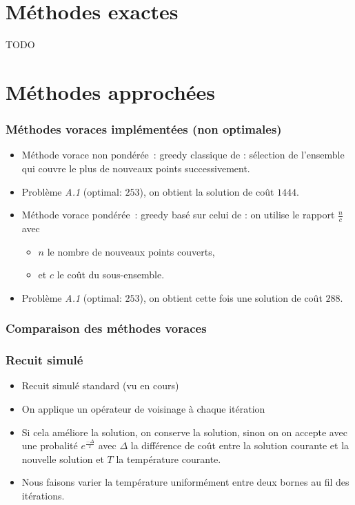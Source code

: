\documentclass[aspectratio=169,11pt]{beamer}
\begin{document}
	\section{Méthodes exactes}

	\begin{frame}
		\centering TODO
	\end{frame}

	\section{Méthodes approchées}

	\begin{frame}
		\frametitle{Méthodes voraces implémentées (non optimales)}
		\begin{itemize}
			\item<1-> Méthode vorace non pondérée~: greedy classique de \citeauthor{Johnson:1973:AAC:800125.804034}: sélection de l'ensemble qui couvre le plus de nouveaux points successivement.
			\item<1->[\(\Rightarrow\)] Problème \emph{A.1} (optimal: \(253\)), on obtient la solution de coût \(1444\).
			\vfill
			\item<2-> Méthode vorace pondérée~: greedy basé sur celui de \citeauthor{Johnson:1973:AAC:800125.804034}: on utilise le rapport \(\frac{n}{c}\) avec
				\begin{itemize}
					\item \(n\) le nombre de nouveaux points couverts,
					\item et \(c\) le coût du sous-ensemble.
				\end{itemize}
			\item<2->[\(\Rightarrow\)] Problème \emph{A.1} (optimal: \(253\)), on obtient cette fois une solution de coût \(288\).
		\end{itemize}
	\end{frame}

	\begin{frame}
		\frametitle{Comparaison des méthodes voraces}
		\centering
		
	\end{frame}

	\begin{frame}
		\frametitle{Recuit simulé}
		\begin{itemize}
			\item Recuit simulé standard (vu en cours)
			\item On applique un opérateur de voisinage à chaque itération
			\item Si cela améliore la solution, on conserve la solution, sinon on on accepte avec une
				probalité \(e^{\frac{-\Delta}{T}}\) avec \(\Delta\) la différence de coût
				entre la solution courante et la nouvelle solution et \(T\) la température courante.
			\item Nous faisons varier la température uniformément entre deux bornes au fil des itérations.
		\end{itemize}
	\end{frame}
\end{document}
